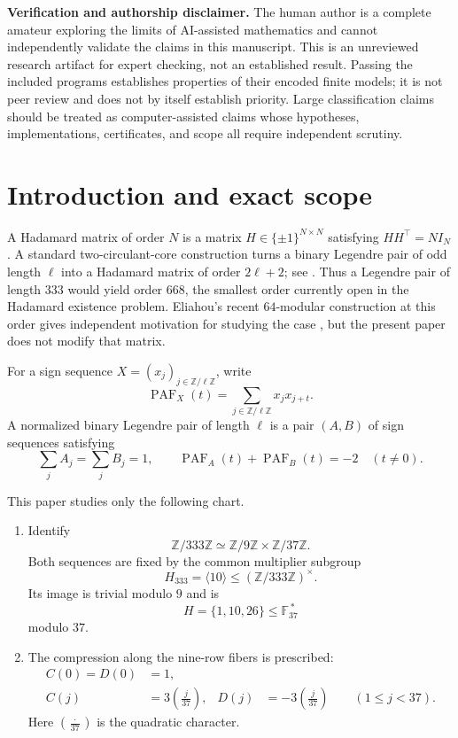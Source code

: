 \documentclass[11pt]{article}
\theoremstyle{remark}
\newcommand{\F}{\mathbb F}
\newcommand{\Z}{\mathbb Z}
\newcommand{\PAF}{\operatorname{PAF}}
\begin{document}
\noindent\textbf{Verification and authorship disclaimer.}
The human author is a complete amateur exploring the limits of
AI-assisted mathematics and cannot independently validate the claims in
this manuscript.  This is an unreviewed research artifact for expert
checking, not an established result.  Passing the included programs
establishes properties of their encoded finite models; it is not peer
review and does not by itself establish priority.  Large classification
claims should be treated as computer-assisted claims whose hypotheses,
implementations, certificates, and scope all require independent scrutiny.

\section{Introduction and exact scope}

A Hadamard matrix of order $N$ is a matrix
$H\in\{\pm1\}^{N\times N}$ satisfying $HH^\top=NI_N$.  A standard
two-circulant-core construction turns a binary Legendre pair of odd length
$\ell$ into a Hadamard matrix of order $2\ell+2$; see
\cite{fletcher2001,kotsireas2006,barrera2022}.  Thus a Legendre pair of
length $333$ would yield order $668$, the smallest order currently open in
the Hadamard existence problem.  Eliahou's recent $64$-modular construction
at this order gives independent motivation for studying the case
\cite{eliahou2025}, but the present paper does not modify that matrix.

For a sign sequence $X=(x_j)_{j\in\Z/\ell\Z}$, write
\[
 \PAF_X(t)=\sum_{j\in\Z/\ell\Z}x_jx_{j+t}.
\]
A normalized binary Legendre pair of length $\ell$ is a pair $(A,B)$ of
sign sequences satisfying
\begin{equation}
 \sum_jA_j=\sum_jB_j=1,\qquad
 \PAF_A(t)+\PAF_B(t)=-2\quad(t\ne0).
 \label{eq:LP}
\end{equation}

This paper studies only the following chart.

\begin{enumerate}
\item Identify
\[
 \Z/333\Z\simeq\Z/9\Z\times\Z/37\Z.
\]
Both sequences are fixed by the common multiplier subgroup
\[
 H_{333}=\langle10\rangle\leq(\Z/333\Z)^\times.
\]
Its image is trivial modulo $9$ and is
\[
 H=\{1,10,26\}\leq\F_{37}^{\,*}
\]
modulo $37$.

\item The compression along the nine-row fibers is prescribed:
\begin{align}
 C(0)=D(0)&=1,\nonumber\\
 C(j)&=3\left(\frac{j}{37}\right),&
 D(j)&=-3\left(\frac{j}{37}\right)
 \qquad(1\leq j<37).
 \label{eq:prescribed}
\end{align}
Here $(\frac{\cdot}{37})$ is the quadratic character.
\end{enumerate}
\end{document}

